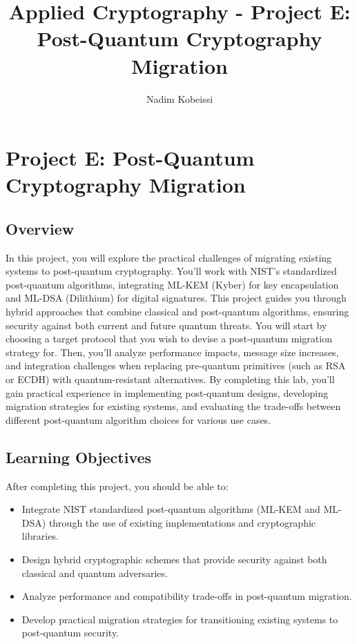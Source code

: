 \documentclass[10pt,a4paper,american]{exam}
\title{Applied Cryptography - Project E: Post-Quantum Cryptography Migration}
\author{Nadim Kobeissi}
\begin{document}
\classhandoutheader
\section*{Project E: Post-Quantum Cryptography Migration}

\subsection*{Overview}
In this project, you will explore the practical challenges of migrating existing systems to post-quantum cryptography. You'll work with NIST's standardized post-quantum algorithms, integrating ML-KEM (Kyber) for key encapsulation and ML-DSA (Dilithium) for digital signatures. This project guides you through hybrid approaches that combine classical and post-quantum algorithms, ensuring security against both current and future quantum threats. You will start by choosing a target protocol that you wish to devise a post-quantum migration strategy for. Then, you'll analyze performance impacts, message size increases, and integration challenges when replacing pre-quantum primitives (such as RSA or ECDH) with quantum-resistant alternatives. By completing this lab, you'll gain practical experience in implementing post-quantum designs, developing migration strategies for existing systems, and evaluating the trade-offs between different post-quantum algorithm choices for various use cases.

\subsection*{Learning Objectives}
After completing this project, you should be able to:
\begin{itemize}
	\item Integrate NIST standardized post-quantum algorithms (ML-KEM and ML-DSA) through the use of existing implementations and cryptographic libraries.
	\item Design hybrid cryptographic schemes that provide security against both classical and quantum adversaries.
	\item Analyze performance and compatibility trade-offs in post-quantum migration.
	\item Develop practical migration strategies for transitioning existing systems to post-quantum security.
\end{itemize}
\end{document}
